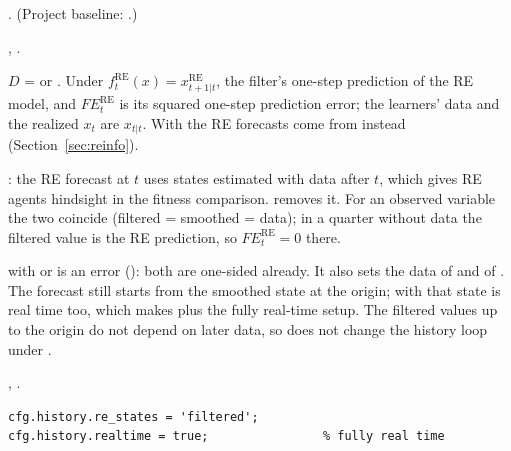 \documentclass[11pt,a4paper]{article}
\DeclareRobustCommand{\codem}[1]{\texttt{\detokenize{#1}}}
\newenvironment{optspec}%
  {\begin{description}[style=sameline,leftmargin=2.7cm,labelwidth=2.5cm,font=\normalfont\itshape]}%
  {\end{description}}
\newcommand{\RE}{\mathrm{RE}}
\newcommand{\fRE}{f^{\RE}}
\newcommand{\FE}{\mathit{FE}}
\begin{document}
\subsubsection{\texorpdfstring{\codem{history.re_states}}{history.re\_states}}\label{opt:history-re-states}
\begin{optspec}
  \item[Default] . (Project baseline: .)
  \item[Values] , .
  \item[Math] $D$ =  or . Under 
        $\fRE_t(x) = x^{\RE}_{t+1|t}$, the filter's one-step prediction of the RE model, and
        $\FE^{\RE}_t$ is its squared one-step prediction error; the learners' data and the
        realized $x_t$ are $x_{t|t}$. With  the RE forecasts come from
         instead (Section~\ref{sec:reinfo}).
  \item[Assumptions] : the RE forecast at $t$ uses states estimated with data
        after $t$, which gives RE agents hindsight in the fitness comparison.  removes
        it. For an observed variable the two coincide (filtered = smoothed = data); in a quarter
        without data the filtered value is the RE prediction, so $\FE^{\RE}_t = 0$ there.
  \item[Interactions]  with  or  is an error
        (): both are one-sided already. It also sets the data of
         and of . The
        forecast still starts from the smoothed state at the origin; with
         that state is real time too, which makes
         plus  the fully real-time setup. The filtered values up
        to the origin do not depend on later data, so  does not change the history
        loop under .
  \item[Code] , .
  \item[Example]
\begin{lstlisting}
cfg.history.re_states = 'filtered';
cfg.history.realtime = true;                % fully real time
\end{lstlisting}
\end{optspec}
\end{document}
